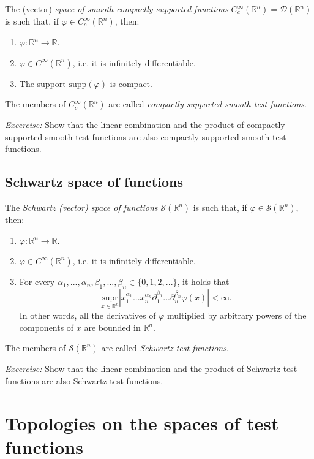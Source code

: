 \documentclass[aps,prl,twocolumn,groupedaddress]{revtex4-2}
\newcommand{\RR}{\mathbb{R}}
\newcommand{\supp}{\mathrm{supp}}
\newcommand{\supr}[2]{\underset{#1}{\text{supr}}}
\begin{document}
The (vector) {\em space of smooth compactly supported functions} $C_c^{\infty}(\RR^n)=\mathcal{D}(\RR^n)$ is such that, if $\varphi\in C_c^{\infty}(\RR^n)$, then:
\begin{enumerate}
\item
$\varphi : \RR^n \to \RR$.

\item
$\varphi \in C^{\infty}(\RR^n)$, i.e. it is infinitely differentiable.

\item
The support $\supp(\varphi)$ is compact.
\end{enumerate}
The members of $C_c^{\infty}(\RR^n)$ are called {\em compactly supported smooth test functions}.

{\em Excercise:} 
Show that the linear combination and the product of compactly supported smooth test functions are also compactly supported smooth test functions.

\subsection{Schwartz space of functions}

The {\em Schwartz (vector) space of functions} $\mathcal{S}(\RR^n)$ is such that, if $\varphi\in \mathcal{S}(\RR^n)$, then:
\begin{enumerate}
\item
$\varphi : \RR^n \to \RR$.

\item
$\varphi \in C^{\infty}(\RR^n)$, i.e. it is infinitely differentiable.

\item For every $\alpha_1,...,\alpha_n,\beta_1,...,\beta_n\in \{0,1,2,...\}$, it holds that
$$
\supr{x\in \RR^n}\,\left|x_1^{\alpha_1}...x_n^{\alpha_n}\partial_1^{\beta_1}...\partial_n^{\beta_n}\varphi(x)\right|<\infty.
$$
In other words, all the derivatives of $\varphi$ multiplied by arbitrary powers of the components of $x$ are bounded in $\RR^n$.
\end{enumerate}
The members of $\mathcal{S}(\RR^n)$ are called {\em Schwartz test functions}.

{\em Excercise:} 
Show that the linear combination and the product of Schwartz test functions are also Schwartz test functions.

\section{Topologies on the spaces of test functions}
\end{document}
